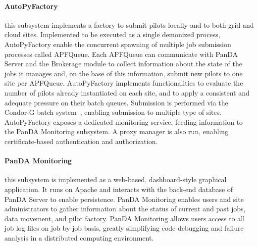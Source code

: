 \paragraph{\textbf{AutoPyFactory}} this subsystem implements a factory to submit
pilots locally and to both grid and cloud sites. Implemented to be executed as a
single demonized process, AutoPyFactory enable the concurrent spawning of
multiple job submission processes called APFQueue. Each APFQueue can communicate
with PanDA Server and the Brokerage module to collect information about the
state of the jobs it manages and, on the base of this information, submit new
pilots to one site per APFQueue. AutoPyFactory implements functionalities to
evaluate the number of pilots already instantiated on each site, and to apply a
consistent and adequate pressure on their batch queues. Submission is performed
via the Condor-G batch system~\cite{}, enabling submission to multiple type of
sites. AutoPyFactory exposes a dedicated monitoring service, feeding information
to the PanDA Monitoring subsystem. A proxy manager is also run, enabling
certificate-based authentication and authorization.


\paragraph{\textbf{PanDA Monitoring}} this subsystem is implemented as a
web-based, dashboard-style graphical application. It runs on Apache and
interacts with the back-end database of PanDA Server to enable persistence.
PanDA Monitoring enables users and site administrators to gather information
about the status of current and past jobs, data movement, and pilot factory.
PanDA Monitoring allows users access to all job log files on job by job basis,
greatly simplifying code debugging and failure analysis in a distributed
computing environment.

